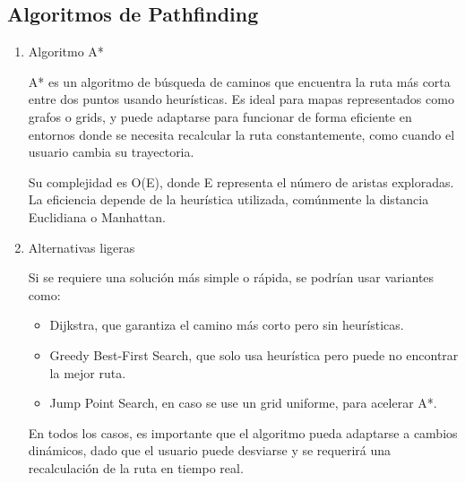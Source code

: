 \documentclass{article}
\begin{document}
\subsection{Algoritmos de Pathfinding}
\begin{enumerate}[label=\thesubsection.\arabic*]
    \item Algoritmo A*  
        
    A* es un algoritmo de búsqueda de caminos que encuentra la ruta más corta entre dos puntos usando heurísticas. Es ideal para mapas representados como grafos o grids, y puede adaptarse para funcionar de forma eficiente en entornos donde se necesita recalcular la ruta constantemente, como cuando el usuario cambia su trayectoria.

    Su complejidad es O(E), donde E representa el número de aristas exploradas. La eficiencia depende de la heurística utilizada, comúnmente la distancia Euclidiana o Manhattan.

    \item Alternativas ligeras
    
    Si se requiere una solución más simple o rápida, se podrían usar variantes como:
	
    \begin{itemize}
        \item Dijkstra, que garantiza el camino más corto pero sin heurísticas.
        \item Greedy Best-First Search, que solo usa heurística pero puede no encontrar la mejor ruta.
        \item Jump Point Search, en caso se use un grid uniforme, para acelerar A*.
    \end{itemize}

    En todos los casos, es importante que el algoritmo pueda adaptarse a cambios dinámicos, dado que el usuario puede desviarse y se requerirá una recalculación de la ruta en tiempo real.
\end{enumerate}
\end{document}
